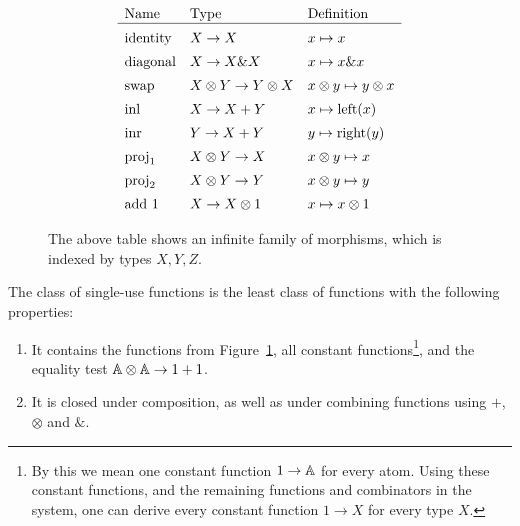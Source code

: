 \begin{figure}
    \begin{align*}
    \begin{array}{llll}
        \text{Name} & \text{Type} & \text{Definition} \\
        \hline
        \addlinespace
        \text{identity} &  X \to X  & x \mapsto x\\
    \addlinespace
    \text{diagonal} &  X \to X \& X  & x \mapsto x \& x\\
    \addlinespace
    \text{swap} &  X \otimes Y \to Y \otimes X  & x \otimes y \mapsto y \otimes x\\
    \addlinespace
    \text{inl} &  X \to X + Y  & x \mapsto \text{left}(x)\\
    \addlinespace
    \text{inr} &  Y \to X + Y  & y \mapsto \text{right}(y)\\
    \addlinespace
    \text{proj}_1 &  X \otimes Y \to X & x \otimes y \mapsto x\\
    \addlinespace
    \text{proj}_2 &  X \otimes Y \to Y & x \otimes y \mapsto y \\
    \addlinespace
    \text{add 1} &  X  \to X \otimes 1 & x  \mapsto x \otimes 1 \\
    \end{array}
    \end{align*}
    \caption{\label{fig:prime-morphisms} The above table shows an infinite family of morphisms, which is indexed by  types $X,Y,Z$.}
\end{figure}


   


\begin{definition} The class of single-use functions is the least class of functions with the following properties:
        \begin{enumerate}
            \item It contains the functions from Figure~\ref{fig:prime-morphisms}, all constant functions\footnote{By this we mean one constant function $1 \to \mathbb A$ for every atom. Using these constant functions, and the remaining functions and combinators in the system, one can derive every constant function $1 \to X$ for every type $X$.}, and the equality test $\mathbb A \otimes \mathbb A \to 1+1$.
            \item It is closed under composition, as well as under combining functions using  $+$, $\otimes$ and $\&$. 
        \end{enumerate}
\end{definition}

